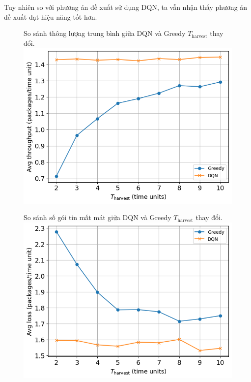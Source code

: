 \documentclass{uetgraduation}
\begin{document}
Tuy nhiên so với phương án đề xuất sử dụng DQN, ta vẫn nhận thấy phương án đề xuất đạt hiệu năng tốt hơn.

\begin{figure}{So sánh thông lượng trung bình giữa DQN và Greedy $T_\text{harvest}$ thay đổi.}
    \centering
    \includegraphics[scale=0.8]{t_harvest_throughput.png}
    \label{fig:t_throughput}
\end{figure}
\begin{figure}{So sánh số gói tin mất mát giữa DQN và Greedy $T_\text{harvest}$ thay đổi.}
    \centering
    \includegraphics[scale=0.8]{t_harvest_loss.png}
    \label{fig:t_loss}
\end{figure}
\end{document}
